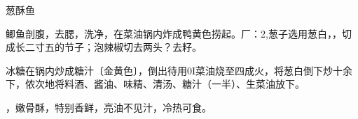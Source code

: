 \begin{recipe}{葱酥鱼}

\ingredients


\preparation

\step 鲫鱼剖腹，去腮，洗净，在菜油锅内炸成鸭黄色捞起。厂：2,葱子选用葱白，，切
成长二寸五的节子；泡辣椒切去两头？去籽。

\step 冰糖在锅内炒成糖汁〔金黄色〕，倒出待用0I菜油烧至四成火，将葱白倒下炒十余
下，侬次地将料酒、酱油、味精、清汤、糖汁（一半）、生菜油放下。

\features

，嫩骨酥，特别香鲜，亮油不见汁，冷热可食。

\end{recipe}

